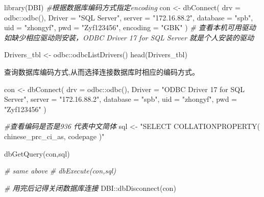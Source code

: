 \documentclass[
]{book}
\newenvironment{Shaded}{\begin{snugshade}}{\end{snugshade}}
\newcommand{\AttributeTok}[1]{\textcolor[rgb]{0.77,0.63,0.00}{#1}}
\newcommand{\CommentTok}[1]{\textcolor[rgb]{0.56,0.35,0.01}{\textit{#1}}}
\newcommand{\FunctionTok}[1]{\textcolor[rgb]{0.00,0.00,0.00}{#1}}
\newcommand{\NormalTok}[1]{#1}
\newcommand{\OtherTok}[1]{\textcolor[rgb]{0.56,0.35,0.01}{#1}}
\newcommand{\SpecialCharTok}[1]{\textcolor[rgb]{0.00,0.00,0.00}{#1}}
\newcommand{\StringTok}[1]{\textcolor[rgb]{0.31,0.60,0.02}{#1}}
\begin{document}
\begin{Shaded}
\begin{Highlighting}[]
\FunctionTok{library}\NormalTok{(DBI)}
\CommentTok{\#根据数据库编码方式指定encoding}
\NormalTok{con }\OtherTok{\textless{}{-}} \FunctionTok{dbConnect}\NormalTok{(}
  \AttributeTok{drv =}\NormalTok{ odbc}\SpecialCharTok{::}\FunctionTok{odbc}\NormalTok{(), }\AttributeTok{Driver =} \StringTok{"SQL Server"}\NormalTok{, }\AttributeTok{server =} \StringTok{"172.16.88.2"}\NormalTok{,}
  \AttributeTok{database =} \StringTok{"spb"}\NormalTok{, }\AttributeTok{uid =} \StringTok{"zhongyf"}\NormalTok{, }\AttributeTok{pwd =} \StringTok{"Zyf123456"}\NormalTok{, }\AttributeTok{encoding =} \StringTok{"GBK"}
\NormalTok{)}
\CommentTok{\# 查看本机可用驱动 如缺少相应驱动则安装，ODBC Driver 17 for SQL Server 就是个人安装的驱动}

\NormalTok{Drivers\_tbl }\OtherTok{\textless{}{-}}\NormalTok{ odbc}\SpecialCharTok{::}\FunctionTok{odbcListDrivers}\NormalTok{() }
\FunctionTok{head}\NormalTok{(Drivers\_tbl)}
\end{Highlighting}
\end{Shaded}

查询数据库编码方式,从而选择连接数据库时相应的编码方式。

\begin{Shaded}
\begin{Highlighting}[]
\NormalTok{con }\OtherTok{\textless{}{-}} \FunctionTok{dbConnect}\NormalTok{(}
  \AttributeTok{drv =}\NormalTok{ odbc}\SpecialCharTok{::}\FunctionTok{odbc}\NormalTok{(), }\AttributeTok{Driver =} \StringTok{"ODBC Driver 17 for SQL Server"}\NormalTok{,}
  \AttributeTok{server =} \StringTok{"172.16.88.2"}\NormalTok{, }\AttributeTok{database =} \StringTok{"spb"}\NormalTok{, }\AttributeTok{uid =} \StringTok{"zhongyf"}\NormalTok{, }\AttributeTok{pwd =} \StringTok{"Zyf123456"}
\NormalTok{)}

\CommentTok{\#查看编码是否是936 代表中文简体}
\NormalTok{sql }\OtherTok{\textless{}{-}} \StringTok{"SELECT COLLATIONPROPERTY( \textquotesingle{}chinese\_prc\_ci\_as\textquotesingle{}, \textquotesingle{}codepage\textquotesingle{} )"}

\FunctionTok{dbGetQuery}\NormalTok{(con,sql)}

\CommentTok{\# same above}
\CommentTok{\# dbExecute(con,sql)}

\CommentTok{\# 用完后记得关闭数据库连接}
\NormalTok{DBI}\SpecialCharTok{::}\FunctionTok{dbDisconnect}\NormalTok{(con)}
\end{Highlighting}
\end{Shaded}
\end{document}
